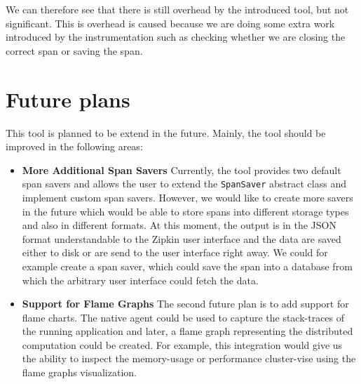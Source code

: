 We can therefore see that there is still overhead by the introduced tool, but not significant. This is overhead is caused because we are doing some extra work introduced by the instrumentation such as checking whether we are closing the correct span or saving the span.
\section{Future plans}
This tool is planned to be extend in the future. Mainly, the tool should be improved in the following areas:
\begin{itemize}
\item \textbf{More Additional Span Savers} \newline
Currently, the tool provides two default span savers and allows the user to extend the \texttt{SpanSaver} abstract class and implement custom span savers. However, we would like to create more savers in the future which would be able to store spans into different storage types and also in different formats. At this moment, the output is in the JSON format understandable to the Zipkin user interface and the data are saved either to disk or are send to the user interface right away. We could for example create a span saver, which could save the span into a database from which the arbitrary user interface could fetch the data.
\item \textbf{Support for Flame Graphs} \newline
The second future plan is to add support for flame charts. The native agent could be used to capture the stack-traces of the running application and later, a flame graph representing the distributed computation could be created. For example, this integration would give us the ability to inspect the memory-usage or performance cluster-vise using the flame graphs visualization.
\end{itemize}



